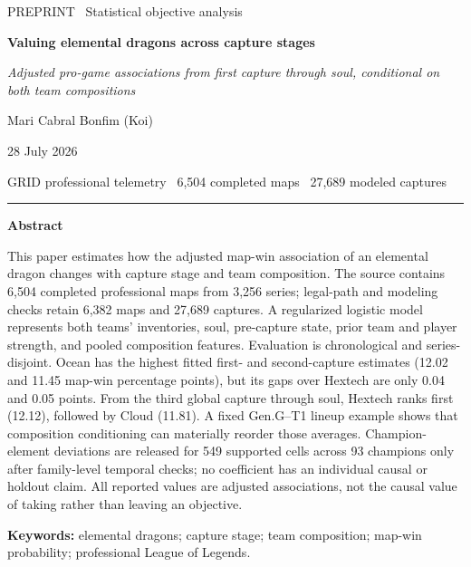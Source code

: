 \documentclass[10pt,letterpaper]{article}
\begin{document}
\begin{center}
{\small\sffamily\color{steel}\MakeUppercase{Preprint} \textperiodcentered\ Statistical objective analysis\par}
\vspace{0.75em}
{\fontsize{23}{27}\selectfont\bfseries Valuing elemental dragons across capture stages\par}
\vspace{0.38em}
{\large\itshape\color{muted}Adjusted pro-game associations from first capture through soul, conditional on both team compositions\par}
\vspace{0.90em}
{\large Mari Cabral Bonfim (Koi)\par}
\vspace{0.22em}
{\small\color{muted}28 July 2026\par}
\vspace{0.22em}
{\small\color{muted}GRID professional telemetry \textperiodcentered\ 6,504 completed maps \textperiodcentered\ 27,689 modeled captures\par}
\vspace{0.72em}
\rule{0.92\linewidth}{0.55pt}
\end{center}

\begin{center}
\begin{minipage}{0.91\linewidth}
\begin{center}\textbf{Abstract}\end{center}
\small
This paper estimates how the adjusted map-win association of an elemental dragon changes with capture stage and team composition. The source contains 6,504 completed professional maps from 3,256 series; legal-path and modeling checks retain 6,382 maps and 27,689 captures. A regularized logistic model represents both teams' inventories, soul, pre-capture state, prior team and player strength, and pooled composition features. Evaluation is chronological and series-disjoint. Ocean has the highest fitted first- and second-capture estimates (12.02 and 11.45 map-win percentage points), but its gaps over Hextech are only 0.04 and 0.05 points. From the third global capture through soul, Hextech ranks first (12.12), followed by Cloud (11.81). A fixed Gen.G--T1 lineup example shows that composition conditioning can materially reorder those averages. Champion-element deviations are released for 549 supported cells across 93 champions only after family-level temporal checks; no coefficient has an individual causal or holdout claim. All reported values are adjusted associations, not the causal value of taking rather than leaving an objective.

\vspace{0.45em}
\noindent\textbf{Keywords:} elemental dragons; capture stage; team composition; map-win probability; professional League of Legends.
\end{minipage}
\end{center}
\end{document}
